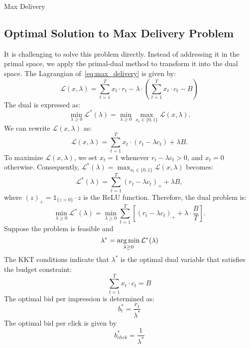 \documentclass[../main.tex]{subfiles}
\begin{document}
\begin{section}{Max Delivery}
	
	

	
	\subsection* {Optimal Solution to Max Delivery Problem}
		\label{sec:md_optimal}
		
		It is challenging to solve this problem directly. Instead of addressing it in the primal space, we apply the primal-dual method to transform it into the dual space. The Lagrangian of~\eqref{eq:max_delivery} is given by:
		\begin{equation*} \label{eq:max_delivery_dual}
			\mathcal{L}(x, \lambda) = \sum_{t=1}^T x_t \cdot r_t  - \lambda \cdot \left( \sum_{t=1}^{T} x_t \cdot c_t  - B  \right)
		\end{equation*}
		The dual  is expressed as:
		\begin{equation*}
			\min_{\lambda \geq 0} \mathcal{L}^*(\lambda) = \min_{\lambda \geq 0} \max_{x_t \in \{0,1\}} \mathcal{L}(x, \lambda).
		\end{equation*}
		We can rewrite \(\mathcal{L}(x, \lambda)\) as:
		\begin{equation*}
			\mathcal{L}(x, \lambda) = \sum_{t=1}^T  x_t \cdot (r_t - \lambda c_t)  + \lambda B.
		\end{equation*}
		To maximize \(\mathcal{L}(x, \lambda)\), we set \(x_t = 1\) whenever \(r_t - \lambda c_t > 0\), and \(x_t = 0\) otherwise. Consequently, \(\mathcal{L}^*(\lambda) = \max_{x_t \in \{0,1\}} \mathcal{L}(x, \lambda)\) becomes:
		\begin{equation*}
			\mathcal{L}^*(\lambda) = \sum_{t=1}^{T} (r_t - \lambda c_t)_{+}  + \lambda B,
		\end{equation*}
		where \((z)_{+} = \mathds{1}_{ \{z>0\}} \cdot z\) is the ReLU function. Therefore, the dual problem is:
		\begin{equation}
			\min_{\lambda \geq 0}  \mathcal{L}^*(\lambda) = \min_{\lambda \geq 0}  \sum_{t=1}^{T} \left[ (r_t - \lambda c_t)_{+} + \lambda \cdot \frac{B}{T} \right].
		\end{equation}
	Suppose the problem is feasible and 
	\[
	\lambda^* = \operatorname*{arg\,min}_{\lambda \geq 0} \mathcal{L}^*(\lambda)
	\]
	The KKT conditions indicate that $\lambda^*$ is the optimal dual variable that satisfies the budget constraint:
	\[
	\sum_{t=1}^{T} x_t \cdot c_t = B
	\]
	The optimal bid per impression is determined as: 
	\begin{equation*}
		b_t^* = \frac{r_t}{ \lambda^*}
	\end{equation*}
	The optimal bid per click is given by 
	\begin{equation}
		b^*_{click} = \frac{1}{\lambda^*}
	\end{equation}



\end{section}
\end{document}
